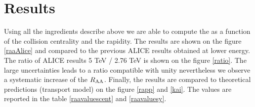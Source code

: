 \graphicspath{{Figures/}}

\section{Results}

Using all the ingredients describe above we are able to compute the \ups \Raa as a function of the collision centrality and the rapidity.
The results are shown on the figure \ref{raaAlice} and compared to the previous ALICE results obtained at lower energy.
The ratio of ALICE results 5 TeV / 2.76 TeV is shown on the figure \ref{ratio}.
The large uncertainties leads to a ratio compatible with unity nevertheless we observe a systematic increase of the $R_\mathrm{AA}$.
Finally, the results are compared to theoretical predictions (transport model) on the figure \ref{rapp} and \ref{kai}. 
The \Raa values are reported in the table \ref{raavaluescent} and \ref{raavaluesy}.

%
%

